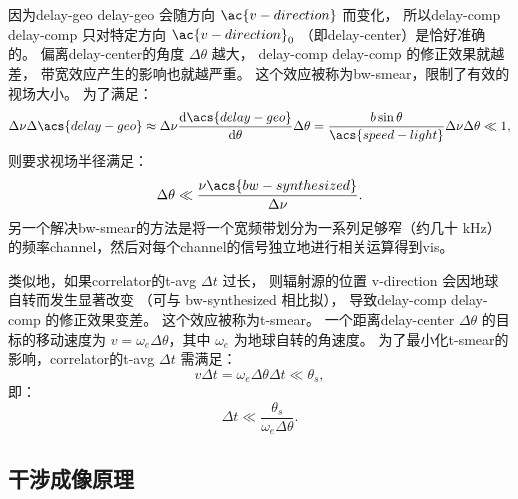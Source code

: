 因为\acl{delay-geo} \acs{delay-geo} 会随方向 $\ac{v-direction}$ 而变化，
所以\acl{delay-comp} \acs{delay-comp} 只对特定方向 $\ac{v-direction}_0$
（即\ac{delay-center}）是恰好准确的。
偏离\ac{delay-center}的角度 $\Delta\theta$ 越大，
\acl{delay-comp} \acs{delay-comp} 的修正效果就越差，
带宽效应产生的影响也就越严重。
这个效应被称为\acf{bw-smear}，限制了有效的视场大小。
为了满足：
\begin{equation}
  \Delta\nu \Delta\acs{delay-geo}
    \approx \Delta\nu \diff{\acs{delay-geo}}{\theta} \Delta\theta
    = \frac{b \sin\theta}{\acs{speed-light}} \Delta\nu \Delta\theta
    \ll 1 ,
\end{equation}
则要求视场半径满足：
\begin{equation}
  \Delta\theta \ll \frac{\nu \acs{bw-synthesized}}{\Delta\nu} .
\end{equation}
另一个解决\ac{bw-smear}的方法是将一个宽频带划分为一系列足够窄（约几十 \si{\kHz}）
的频率\ac{channel}，然后对每个\ac{channel}的信号独立地进行相关运算得到\ac{vis}。

类似地，如果\ac{correlator}的\ac{t-avg} $\Delta t$ 过长，
则辐射源的位置 \ac{v-direction} 会因地球自转而发生显著改变
（可与 \acs{bw-synthesized} 相比拟），
导致\acl{delay-comp} \acs{delay-comp} 的修正效果变差。
这个效应被称为\acf{t-smear}。
一个距离\ac{delay-center} $\Delta\theta$ 的目标的移动速度为
$v = \omega_e \Delta\theta$，其中 $\omega_e$ 为地球自转的角速度。
为了最小化\ac{t-smear}的影响，\ac{correlator}的\ac{t-avg} $\Delta t$ 需满足：
\begin{equation}
  v \Delta t = \omega_e \Delta\theta \Delta t \ll \theta_s ,
\end{equation}
即：
\begin{equation}
  \label{eq:correlator-avgtime}
  \Delta t \ll \frac{\theta_s}{\omega_e \Delta\theta} .
\end{equation}

\subsection{干涉成像原理}

